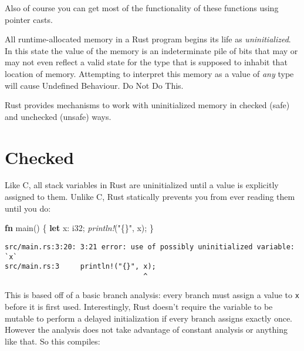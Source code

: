 \documentclass[a4paper,]{book}
\newenvironment{Shaded}{\begin{snugshade}}{\end{snugshade}}
\newcommand{\KeywordTok}[1]{\textcolor[rgb]{0.13,0.29,0.53}{\textbf{{#1}}}}
\newcommand{\DataTypeTok}[1]{\textcolor[rgb]{0.13,0.29,0.53}{{#1}}}
\newcommand{\StringTok}[1]{\textcolor[rgb]{0.31,0.60,0.02}{{#1}}}
\newcommand{\PreprocessorTok}[1]{\textcolor[rgb]{0.56,0.35,0.01}{\textit{{#1}}}}
\newcommand{\NormalTok}[1]{{#1}}
\begin{document}
Also of course you can get most of the functionality of these functions
using pointer casts.


All runtime-allocated memory in a Rust program begins its life as
\emph{uninitialized}. In this state the value of the memory is an
indeterminate pile of bits that may or may not even reflect a valid
state for the type that is supposed to inhabit that location of memory.
Attempting to interpret this memory as a value of \emph{any} type will
cause Undefined Behaviour. Do Not Do This.

Rust provides mechanisms to work with uninitialized memory in checked
(safe) and unchecked (unsafe) ways.

\section{Checked}\label{sec--checked-uninit}

Like C, all stack variables in Rust are uninitialized until a value is
explicitly assigned to them. Unlike C, Rust statically prevents you from
ever reading them until you do:

\begin{Shaded}
\begin{Highlighting}[]
\KeywordTok{fn} \NormalTok{main() \{}
    \KeywordTok{let} \NormalTok{x: }\DataTypeTok{i32}\NormalTok{;}
    \PreprocessorTok{println!}\NormalTok{(}\StringTok{"\{\}"}\NormalTok{, x);}
\NormalTok{\}}
\end{Highlighting}
\end{Shaded}

\begin{verbatim}
src/main.rs:3:20: 3:21 error: use of possibly uninitialized variable: `x`
src/main.rs:3     println!("{}", x);
                                 ^
\end{verbatim}

This is based off of a basic branch analysis: every branch must assign a
value to \texttt{x} before it is first used. Interestingly, Rust doesn't
require the variable to be mutable to perform a delayed initialization
if every branch assigns exactly once. However the analysis does not take
advantage of constant analysis or anything like that. So this compiles:
\end{document}
